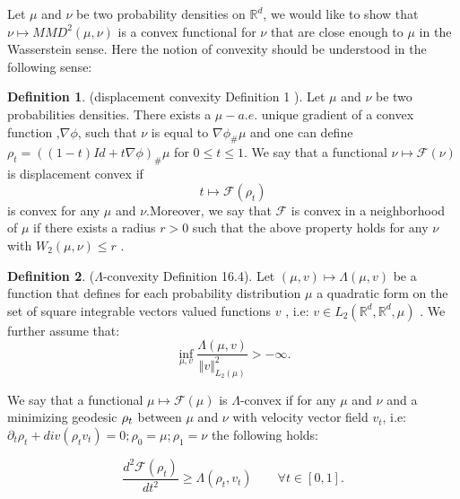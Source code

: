 \documentclass{article}
\newcommand{\1}{\mathbbm 1}
\theoremstyle{definition}
\newtheorem{definition}{Definition}
\begin{document}
Let $\mu$ and $\nu$ be two probability densities on $\mathbb{R}^{d}$,
we would like to show that $\nu\mapsto MMD^{2}(\mu,\nu)$ is a convex
functional for $\nu$ that are close enough to $\mu$ in the Wasserstein
sense. Here the notion of convexity should be understood in the following
sense:
\begin{definition}
(displacement convexity \cite{Villani:2004} Definition 1 ). Let $\mu$
and $\nu$ be two probabilities densities. There exists a $\mu-a.e.$
unique gradient of a convex function ,$\nabla\phi$, such that $\nu$
is equal to $\nabla\phi_{\#}\mu$ and one can define $\rho_{t}=((1-t)Id+t\nabla\phi)_{\#}\mu$
for $0\leq t\leq1$. We say that a functional $\nu\mapsto\mathcal{F}(\nu)$
is displacement convex if 
\[
t\mapsto\mathcal{F}(\rho_{t})
\]
 is convex for any $\mu$ and $\nu$.Moreover, we say that $\mathcal{F}$
is convex in a neighborhood of $\mu$ if there exists a radius $r>0$
such that the above property holds for any $\nu$ with $W_{2}(\mu,\nu)\leq r$
.
\end{definition}
%
\begin{definition}
($\Lambda$-convexity \cite{Villani:2009} Definition 16.4). Let $(\mu,v)\mapsto\Lambda(\mu,v)$
be a function that defines for each probability distribution $\mu$
a quadratic form on the set of square integrable vectors valued functions
$v$ , i.e: $v\in L_{2}(\mathbb{R}^{d},\mathbb{R}^{d},\mu)$ . We
further assume that:
\[
\inf_{\mu,v}\frac{\Lambda(\mu,v)}{\Vert v\Vert_{L_{2}(\mu)}^{2}}>-\infty.
\]

We say that a functional $\mu\mapsto\mathcal{F}(\mu)$ is $\Lambda$-convex
if for any $\mu$ and $\nu$ and a minimizing geodesic $\text{\ensuremath{\rho_{t}}}$
between $\mu$ and $\nu$ with velocity vector field $v_{t}$, i.e:
$\partial_{t}\rho_{t}+div(\rho_{t}v_{t})=0;\rho_{0}=\mu;\rho_{1}=\nu$
the following holds:
\end{definition}
\[
\frac{d^{2}\mathcal{F}(\rho_{t})}{dt^{2}}\geq\Lambda(\rho_{t},v_{t})\qquad\forall t\in[0,1].
\]
\end{document}
